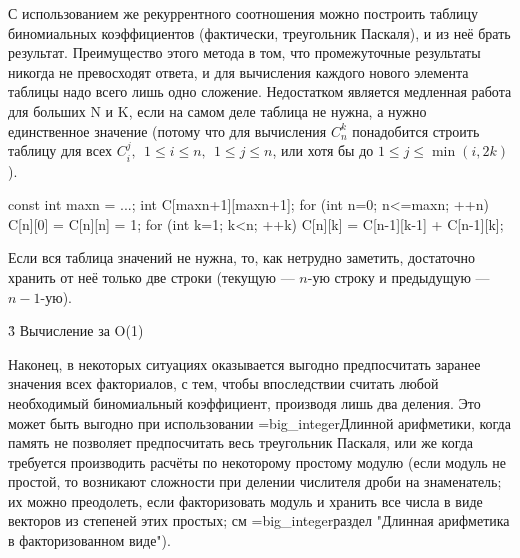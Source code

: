 С использованием же рекуррентного соотношения можно построить таблицу биномиальных коэффициентов (фактически, треугольник Паскаля), и из неё брать результат. Преимущество этого метода в том, что промежуточные результаты никогда не превосходят ответа, и для вычисления каждого нового элемента таблицы надо всего лишь одно сложение. Недостатком является медленная работа для больших N и K, если на самом деле таблица не нужна, а нужно единственное значение (потому что для вычисления $C_n^k$ понадобится строить таблицу для всех $C_i^j,\ \ 1 \le i \le n,\ \ 1 \le j \le n$, или хотя бы до $1 \le j \le \min(i,2k)$).

\code

const int maxn = ...;
int C[maxn+1][maxn+1];
for (int n=0; n<=maxn; ++n) {
	C[n][0] = C[n][n] = 1;
	for (int k=1; k<n; ++k)
		C[n][k] = C[n-1][k-1] + C[n-1][k];
}
\endcode

Если вся таблица значений не нужна, то, как нетрудно заметить, достаточно хранить от неё только две строки (текущую --- $n$-ую строку и предыдущую --- $n-1$-ую).

\h3{ Вычисление за O(1) }

Наконец, в некоторых ситуациях оказывается выгодно предпосчитать заранее значения всех факториалов, с тем, чтобы впоследствии считать любой необходимый биномиальный коэффициент, производя лишь два деления. Это может быть выгодно при использовании \algohref=big_integer{Длинной арифметики}, когда память не позволяет предпосчитать весь треугольник Паскаля, или же когда требуется производить расчёты по некоторому простому модулю (если модуль не простой, то возникают сложности при делении числителя дроби на знаменатель; их можно преодолеть, если факторизовать модуль и хранить все числа в виде векторов из степеней этих простых; см \algohref=big_integer{раздел "Длинная арифметика в факторизованном виде"}).
